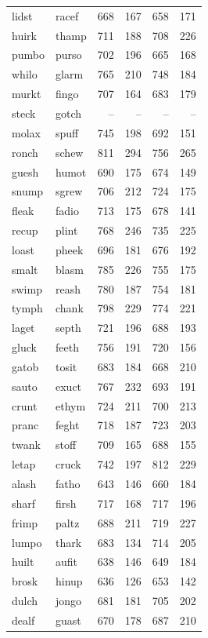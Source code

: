 \documentclass[
]{interact}
\begin{document}
\begin{longtable*}{llrrrr}
lidst & racef & 668 & 167 & 658 & 171 \\ 
huirk & thamp & 711 & 188 & 708 & 226 \\ 
pumbo & purso & 702 & 196 & 665 & 168 \\ 
whilo & glarm & 765 & 210 & 748 & 184 \\ 
murkt & fingo & 707 & 164 & 683 & 179 \\ 
steck & gotch & – & – & – & – \\ 
molax & spuff & 745 & 198 & 692 & 151 \\ 
ronch & schew & 811 & 294 & 756 & 265 \\ 
guesh & humot & 690 & 175 & 674 & 149 \\ 
snump & sgrew & 706 & 212 & 724 & 175 \\ 
fleak & fadio & 713 & 175 & 678 & 141 \\ 
recup & plint & 768 & 246 & 735 & 225 \\ 
loast & pheek & 696 & 181 & 676 & 192 \\ 
smalt & blasm & 785 & 226 & 755 & 175 \\ 
swimp & reash & 780 & 187 & 754 & 181 \\ 
tymph & chank & 798 & 229 & 774 & 221 \\ 
laget & septh & 721 & 196 & 688 & 193 \\ 
gluck & feeth & 756 & 191 & 720 & 156 \\ 
gatob & tosit & 683 & 184 & 668 & 210 \\ 
sauto & exuct & 767 & 232 & 693 & 191 \\ 
crunt & ethym & 724 & 211 & 700 & 213 \\ 
pranc & feght & 718 & 187 & 723 & 203 \\ 
twank & stoff & 709 & 165 & 688 & 155 \\ 
letap & cruck & 742 & 197 & 812 & 229 \\ 
alash & fatho & 643 & 146 & 660 & 184 \\ 
sharf & firsh & 717 & 168 & 717 & 196 \\ 
frimp & paltz & 688 & 211 & 719 & 227 \\ 
lumpo & thark & 683 & 134 & 714 & 205 \\ 
huilt & aufit & 638 & 146 & 649 & 184 \\ 
brosk & hinup & 636 & 126 & 653 & 142 \\ 
dulch & jongo & 681 & 181 & 705 & 202 \\ 
dealf & guast & 670 & 178 & 687 & 210 \\ 

\end{longtable*}
\end{document}
